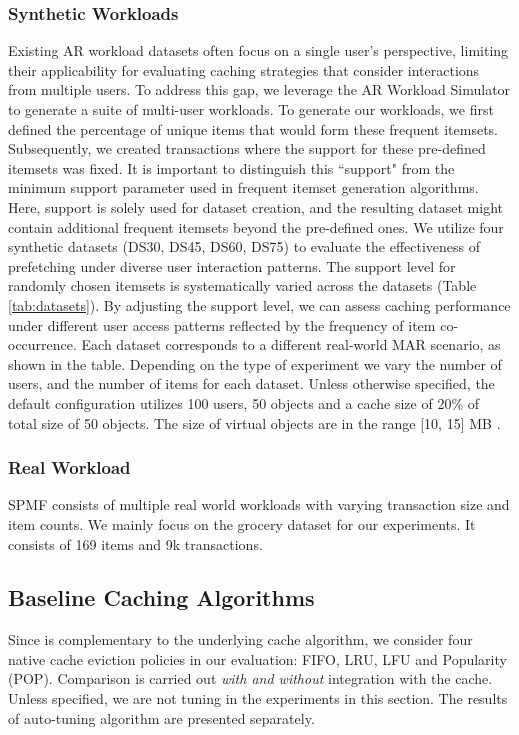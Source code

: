         
        \subsubsection{Synthetic Workloads}
            Existing AR workload datasets often focus on a single user's perspective, limiting their applicability for evaluating caching strategies that consider interactions from multiple users. To address this gap, we leverage the AR Workload Simulator to generate a suite of multi-user workloads. To generate our workloads, we first defined the percentage of unique items that would form these frequent itemsets. Subsequently, we created transactions where the support for these pre-defined itemsets was fixed. It is important to distinguish this ``support" from the minimum support parameter used in frequent itemset generation algorithms. Here, support is solely used for dataset creation, and the resulting dataset might contain additional frequent itemsets beyond the pre-defined ones. We utilize four synthetic datasets (DS30, DS45, DS60, DS75) to evaluate the effectiveness of prefetching under diverse user interaction patterns. The support level for randomly chosen itemsets is systematically varied across the datasets (Table \ref{tab:datasets}). By adjusting the support level, we can assess caching performance under different user access patterns reflected by the frequency of item co-occurrence. Each dataset corresponds to a different real-world MAR scenario, as shown in the table. Depending on the type of experiment we vary the number of users, and the number of items for each dataset. Unless otherwise specified, the default configuration utilizes 100 users, 50 objects and a cache size of 20\% of total size of 50 objects. The size of virtual objects are in the range [10, 15] MB \cite{bib:carsar, bib:objaverse}.

        \subsubsection{Real Workload}
            SPMF \cite{bib:spmf} consists of multiple real world workloads with varying transaction size and item counts. We mainly focus on the grocery dataset for our experiments. It consists of 169 items and 9k transactions.
    
    \subsection{Baseline Caching Algorithms}
        Since \spaarc{} is complementary to the underlying cache algorithm, we consider four native cache eviction policies in our evaluation: FIFO, LRU, LFU and Popularity (POP). Comparison is carried out {\em with and without} \spaarc{} integration with the cache. %
        Unless specified, we are not tuning \spaarc{} in the experiments in this section. The results of auto-tuning algorithm are presented separately.

